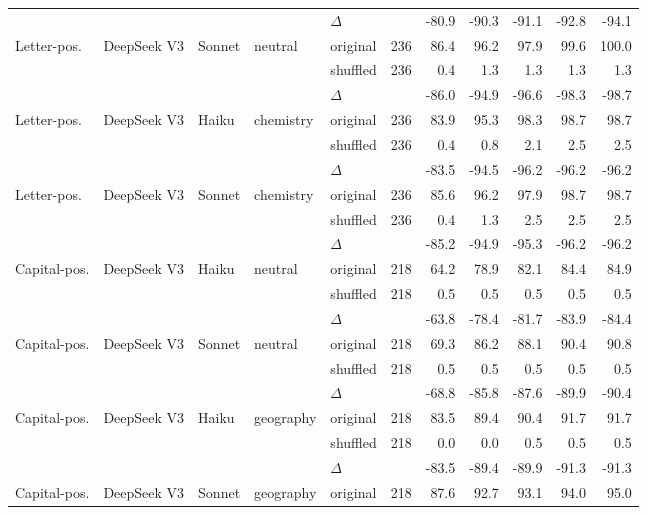 \begin{table}[h]
\begin{tabular}{l l l l l r r r r r r}
  &     &     &     & $\Delta$ &  & -80.9 & -90.3 & -91.1 & -92.8 & -94.1 \\
\addlinespace[3pt]
Letter-pos. & DeepSeek V3 & Sonnet & neutral & original & 236 & 86.4 & 96.2 & 97.9 & 99.6 & 100.0 \\
  &     &     &     & shuffled & 236 & 0.4 & 1.3 & 1.3 & 1.3 & 1.3 \\
  &     &     &     & $\Delta$ &  & -86.0 & -94.9 & -96.6 & -98.3 & -98.7 \\
\addlinespace[3pt]
Letter-pos. & DeepSeek V3 & Haiku & chemistry & original & 236 & 83.9 & 95.3 & 98.3 & 98.7 & 98.7 \\
  &     &     &     & shuffled & 236 & 0.4 & 0.8 & 2.1 & 2.5 & 2.5 \\
  &     &     &     & $\Delta$ &  & -83.5 & -94.5 & -96.2 & -96.2 & -96.2 \\
\addlinespace[3pt]
Letter-pos. & DeepSeek V3 & Sonnet & chemistry & original & 236 & 85.6 & 96.2 & 97.9 & 98.7 & 98.7 \\
  &     &     &     & shuffled & 236 & 0.4 & 1.3 & 2.5 & 2.5 & 2.5 \\
  &     &     &     & $\Delta$ &  & -85.2 & -94.9 & -95.3 & -96.2 & -96.2 \\
\addlinespace[3pt]
Capital-pos. & DeepSeek V3 & Haiku & neutral & original & 218 & 64.2 & 78.9 & 82.1 & 84.4 & 84.9 \\
  &     &     &     & shuffled & 218 & 0.5 & 0.5 & 0.5 & 0.5 & 0.5 \\
  &     &     &     & $\Delta$ &  & -63.8 & -78.4 & -81.7 & -83.9 & -84.4 \\
\addlinespace[3pt]
Capital-pos. & DeepSeek V3 & Sonnet & neutral & original & 218 & 69.3 & 86.2 & 88.1 & 90.4 & 90.8 \\
  &     &     &     & shuffled & 218 & 0.5 & 0.5 & 0.5 & 0.5 & 0.5 \\
  &     &     &     & $\Delta$ &  & -68.8 & -85.8 & -87.6 & -89.9 & -90.4 \\
\addlinespace[3pt]
Capital-pos. & DeepSeek V3 & Haiku & geography & original & 218 & 83.5 & 89.4 & 90.4 & 91.7 & 91.7 \\
  &     &     &     & shuffled & 218 & 0.0 & 0.0 & 0.5 & 0.5 & 0.5 \\
  &     &     &     & $\Delta$ &  & -83.5 & -89.4 & -89.9 & -91.3 & -91.3 \\
\addlinespace[3pt]
Capital-pos. & DeepSeek V3 & Sonnet & geography & original & 218 & 87.6 & 92.7 & 93.1 & 94.0 & 95.0 \\

\end{tabular}
\end{table}

